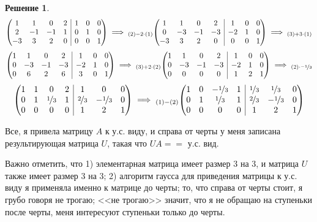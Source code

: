 \documentclass[10pt, a4paper]{extarticle}
\makeatletter
\theoremstyle{definition}
\newtheorem*{Sol}{Решение}
\newenvironment{amatrix}[2]{%
    \left(\begin{array}{@{}*{#1}{c}|*{#2}{c}@{}}
}{%
    \end{array}\right)
}
\makeatother
\begin{document}
\begin{Sol}
\[
\begin{amatrix}{4}{3}
1 & 1 & 0 & 2 & 1 & 0 & 0 \\
2 & -1 & -1 & 1 & 0 & 1 & 0 \\
-3 & 3 & 2 & 0 & 0 & 0 & 1
\end{amatrix} \implies_{(2) - 2\cdot (1)}
\begin{amatrix}{4}{3}
1 & 1 & 0 & 2 & 1 & 0 & 0 \\
0 & -3 & -1 & -3 & -2 & 1 & 0 \\
-3 & 3 & 2 & 0 & 0 & 0 & 1
\end{amatrix} \implies_{(3)+3\cdot(1)}
\]
\[
\begin{amatrix}{4}{3}
1 & 1 & 0 & 2 & 1 & 0 & 0 \\
0 & -3 & -1 & -3 & -2 & 1 & 0 \\
0 & 6 & 2 & 6 & 3 & 0 & 1
\end{amatrix} \implies_{(3) + 2 \cdot (2)}
\begin{amatrix}{4}{3}
1 & 1 & 0 & 2 & 1 & 0 & 0 \\
0 & -3 & -1 & -3 & -2 & 1 & 0 \\
0 & 0 & 0 & 0 & 1 & 2 & 1
\end{amatrix} \implies_{(2) \cdot \nicefrac{-1}{3}}
\]
\[
\begin{amatrix}{4}{3}
1 & 1 & 0 & 2 & 1 & 0 & 0 \\
0 & 1 & \nicefrac{1}{3} & 1 & \nicefrac{2}{3} & -\nicefrac{1}{3} & 0 \\
0 & 0 & 0 & 0 & 1 & 2 & 1
\end{amatrix} \implies_{(1) - (2)}
\begin{amatrix}{4}{3}
1 & 0 & -\nicefrac{1}{3} & 1 & \nicefrac{1}{3} & \nicefrac{1}{3}& 0 \\
0 & 1 & \nicefrac{1}{3} & 1 & \nicefrac{2}{3} & -\nicefrac{1}{3} & 0 \\
0 & 0 & 0 & 0 & 1 & 2 & 1
\end{amatrix}
\]

Все, я привела матрицу $A$ к у.с. виду, и справа от черты у меня записана результирующая матрица $U$, такая что $UA==$ у.с. вид.

Важно отметить, что 1) элементарная матрица имеет размер 3 на 3, и матрица $U$ также имеет размер 3 на 3; 2) алгоритм гаусса для приведения матрицы к у.с. виду я применяла именно к матрице до черты; то, что справа от черты стоит, я грубо говоря не трогаю; <<не трогаю>> значит, что я не обращаю на ступеньки после черты, меня интересуют ступеньки только до черты. 
\end{Sol}
\end{document}
